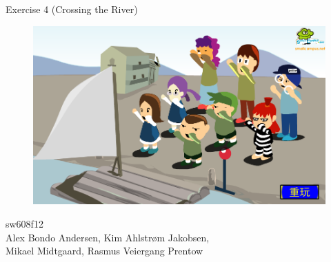 \center
\huge{Exercise 4 (Crossing the River)}

\begin{figure}[H]%
\includegraphics[width=\columnwidth]{pictures/front.png}%
\end{figure}

\large{sw608f12} \\

\large{Alex Bondo Andersen, Kim Ahlstrøm Jakobsen,\\Mikael Midtgaard, Rasmus Veiergang Prentow}